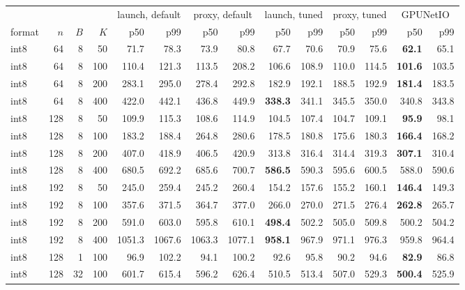 \begin{tabular}{lrrrrrrrrrrrrr}\toprule
 & & & & \multicolumn{2}{c}{launch, default} & \multicolumn{2}{c}{proxy, default} & \multicolumn{2}{c}{launch, tuned} & \multicolumn{2}{c}{proxy, tuned} & \multicolumn{2}{c}{GPUNetIO} \\
\cmidrule(lr){5-6}\cmidrule(lr){7-8}\cmidrule(lr){9-10}\cmidrule(lr){11-12}\cmidrule(lr){13-14}
format & $n$ & $B$ & $K$ & p50 & p99 & p50 & p99 & p50 & p99 & p50 & p99 & p50 & p99 \\ \midrule
int8 & 64 & 8 & 50 & 71.7 & 78.3 & 73.9 & 80.8 & 67.7 & 70.6 & 70.9 & 75.6 & \textbf{62.1} & 65.1 \\
int8 & 64 & 8 & 100 & 110.4 & 121.3 & 113.5 & 208.2 & 106.6 & 108.9 & 110.0 & 114.5 & \textbf{101.6} & 103.5 \\
int8 & 64 & 8 & 200 & 283.1 & 295.0 & 278.4 & 292.8 & 182.9 & 192.1 & 188.5 & 192.9 & \textbf{181.4} & 183.5 \\
int8 & 64 & 8 & 400 & 422.0 & 442.1 & 436.8 & 449.9 & \textbf{338.3} & 341.1 & 345.5 & 350.0 & 340.8 & 343.8 \\
int8 & 128 & 8 & 50 & 109.9 & 115.3 & 108.6 & 114.9 & 104.5 & 107.4 & 104.7 & 109.1 & \textbf{95.9} & 98.1 \\
int8 & 128 & 8 & 100 & 183.2 & 188.4 & 264.8 & 280.6 & 178.5 & 180.8 & 175.6 & 180.3 & \textbf{166.4} & 168.2 \\
int8 & 128 & 8 & 200 & 407.0 & 418.9 & 406.5 & 420.9 & 313.8 & 316.4 & 314.4 & 319.3 & \textbf{307.1} & 310.4 \\
int8 & 128 & 8 & 400 & 680.5 & 692.2 & 685.6 & 700.7 & \textbf{586.5} & 590.3 & 595.6 & 600.5 & 588.0 & 590.6 \\
int8 & 192 & 8 & 50 & 245.0 & 259.4 & 245.2 & 260.4 & 154.2 & 157.6 & 155.2 & 160.1 & \textbf{146.4} & 149.3 \\
int8 & 192 & 8 & 100 & 357.6 & 371.5 & 364.7 & 377.0 & 266.0 & 270.0 & 271.5 & 276.4 & \textbf{262.8} & 265.7 \\
int8 & 192 & 8 & 200 & 591.0 & 603.0 & 595.8 & 610.1 & \textbf{498.4} & 502.2 & 505.0 & 509.8 & 500.2 & 504.2 \\
int8 & 192 & 8 & 400 & 1051.3 & 1067.6 & 1063.3 & 1077.1 & \textbf{958.1} & 967.9 & 971.1 & 976.3 & 959.8 & 964.4 \\
int8 & 128 & 1 & 100 & 96.9 & 102.2 & 94.1 & 100.2 & 92.6 & 95.8 & 90.2 & 94.6 & \textbf{82.9} & 86.8 \\
int8 & 128 & 32 & 100 & 601.7 & 615.4 & 596.2 & 626.4 & 510.5 & 513.4 & 507.0 & 529.3 & \textbf{500.4} & 525.9 \\

\end{tabular}
